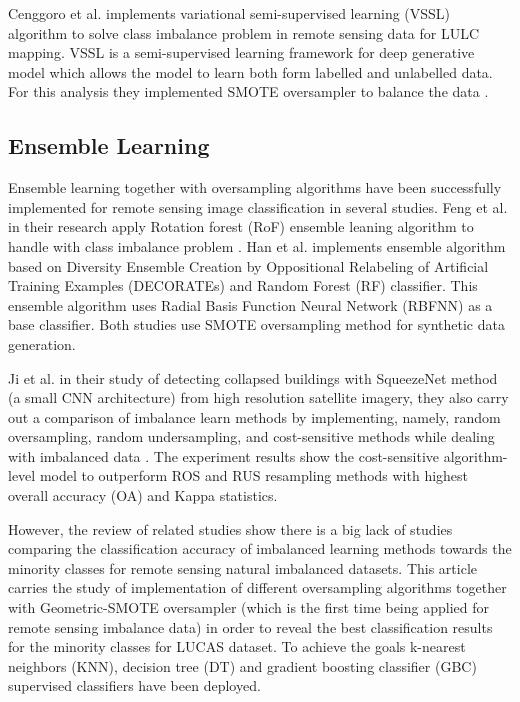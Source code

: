 \documentclass[parskip=full]{scrartcl}
\begin{document}
Cenggoro et al. implements variational semi-supervised learning (VSSL) algorithm
to solve class imbalance problem in remote sensing data for LULC mapping. VSSL
is a semi-supervised learning framework for deep generative model which allows
the model to learn both form labelled and unlabelled data. For this analysis
they implemented SMOTE oversampler to balance the data
\cite{cenggoro2017classification}. 

\subsection{Ensemble Learning}
Ensemble learning together with oversampling algorithms have been successfully
implemented for remote sensing image classification in several studies. Feng et
al. in their research apply Rotation forest (RoF) ensemble leaning algorithm to
handle with class imbalance problem \cite{feng2019imbalanced}. Han et al.
\cite{han2012remote} implements ensemble algorithm based on Diversity Ensemble
Creation by Oppositional Relabeling of Artificial Training Examples (DECORATEs)
and Random Forest (RF) classifier. This ensemble algorithm uses Radial Basis
Function Neural Network (RBFNN) as a base classifier. Both studies use SMOTE
oversampling method for synthetic data generation.

Ji et al. in their study of detecting collapsed buildings with SqueezeNet method
(a small CNN architecture) from high resolution satellite imagery, they also
carry out a comparison of imbalance learn methods by implementing, namely,
random oversampling, random undersampling, and cost-sensitive methods while
dealing with imbalanced data \cite{ji2018identifying}. The experiment results
show the cost-sensitive algorithm-level model to outperform ROS and RUS
resampling methods with highest overall accuracy (OA) and Kappa statistics.

However, the review of related studies show there is a big lack of studies
comparing the classification accuracy of imbalanced learning methods towards the
minority classes for remote sensing natural imbalanced datasets. This article
carries the study of implementation of different oversampling algorithms
together with Geometric-SMOTE oversampler (which is the first time being applied
for remote sensing imbalance data) in order to reveal the best classification
results for the minority classes for LUCAS dataset.  To achieve the goals
k-nearest neighbors (KNN), decision tree (DT) and gradient boosting classifier
(GBC) supervised classifiers have been deployed.



\end{document}
